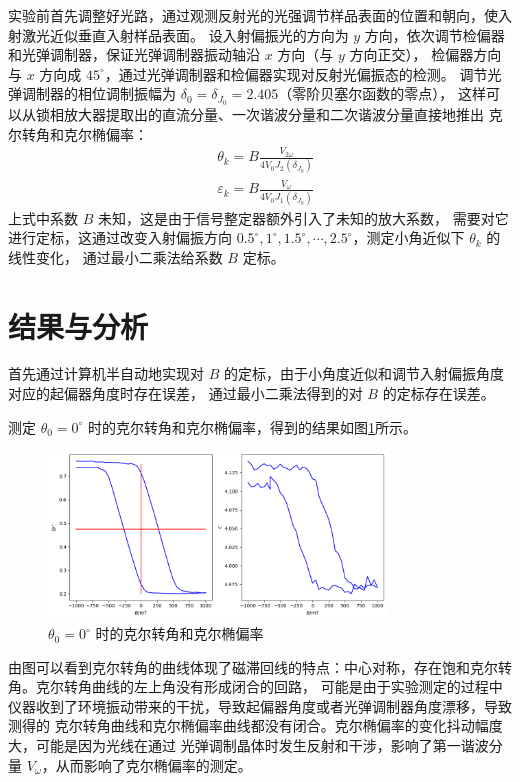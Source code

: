 \documentclass[revtex4-2]{mpltx}
\begin{document}
    实验前首先调整好光路，通过观测反射光的光强调节样品表面的位置和朝向，使入射激光近似垂直入射样品表面。
    设入射偏振光的方向为 $y$ 方向，依次调节检偏器和光弹调制器，保证光弹调制器振动轴沿 $x$ 方向（与 $y$ 方向正交），
    检偏器方向与 $x$ 方向成 $45^\circ$，通过光弹调制器和检偏器实现对反射光偏振态的检测。
    调节光弹调制器的相位调制振幅为 $\delta_0=\delta_{J_0}=2.405$（零阶贝塞尔函数的零点），
    这样可以从锁相放大器提取出的直流分量、一次谐波分量和二次谐波分量直接地推出
    克尔转角和克尔椭偏率：
    \begin{align}
        \label{eq:1}&\theta_k = B\frac{V_{2\omega}}{4V_{0}J_2(\delta_{J_0})}\\
        \label{eq:2}&\varepsilon_k = B\frac{V_\omega}{4V_{0}J_1(\delta_{J_0})}
    \end{align}
    上式中系数 $B$ 未知，这是由于信号整定器额外引入了未知的放大系数，
    需要对它进行定标，这通过改变入射偏振方向 $0.5^\circ, 1^\circ, 1.5^\circ,\cdots, 2.5^\circ$，测定小角近似下 $\theta_k$ 的线性变化，
    通过最小二乘法给系数 $B$ 定标。
\section{结果与分析}
    首先通过计算机半自动地实现对 $B$ 的定标，由于小角度近似和调节入射偏振角度对应的起偏器角度时存在误差，
    通过最小二乘法得到的对 $B$ 的定标存在误差。

    测定 $\theta_0 = 0^\circ$ 时的克尔转角和克尔椭偏率，得到的结果如图\ref{fig:2}所示。
    
    \begin{figure}[htbp]
        \centering
        \includegraphics[width=0.8\textwidth]{./2.png}
        \caption{$\theta_0 = 0^\circ$ 时的克尔转角和克尔椭偏率}\label{fig:2}
    \end{figure}

    由图可以看到克尔转角的曲线体现了磁滞回线的特点：中心对称，存在饱和克尔转角。克尔转角曲线的左上角没有形成闭合的回路，
    可能是由于实验测定的过程中仪器收到了环境振动带来的干扰，导致起偏器角度或者光弹调制器角度漂移，导致测得的
    克尔转角曲线和克尔椭偏率曲线都没有闭合。克尔椭偏率的变化抖动幅度大，可能是因为光线在通过
    光弹调制晶体时发生反射和干涉，影响了第一谐波分量 $V_\omega$，从而影响了克尔椭偏率的测定。
\end{document}
